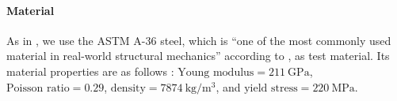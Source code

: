 \paragraph{Material}


\cite{Sigmund01Line}

As in \cite{Valdez17Topology}, we use the ASTM A-36 steel,
which is ``one of the most commonly used material in
real-world structural mechanics'' according to \cite{Valdez17Topology},
as test material.
Its material properties are as follows \cite{Valdez17Topology}:
$\text{Young modulus} = \SI{211}{\giga\pascal}$,
$\text{Poisson ratio} = 0.29$,
$\text{density} = \SI{7874}{\kilogram\per\meter\cubed}$, and
$\text{yield stress} = \SI{220}{\mega\pascal}$.
